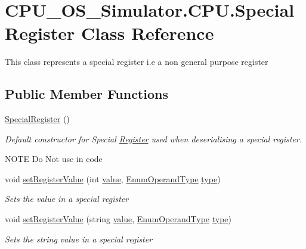 \hypertarget{class_c_p_u___o_s___simulator_1_1_c_p_u_1_1_special_register}{}\section{C\+P\+U\+\_\+\+O\+S\+\_\+\+Simulator.\+C\+P\+U.\+Special\+Register Class Reference}
\label{class_c_p_u___o_s___simulator_1_1_c_p_u_1_1_special_register}


This class represents a special register i.\+e a non general purpose register  


\subsection*{Public Member Functions}
\begin{DoxyCompactItemize}
\item 
\hyperlink{class_c_p_u___o_s___simulator_1_1_c_p_u_1_1_special_register_a697f3e6f938ad7ab0ceee0555fe2c312}{Special\+Register} ()
\begin{DoxyCompactList}\small\item\em Default constructor for Special \hyperlink{class_c_p_u___o_s___simulator_1_1_c_p_u_1_1_register}{Register} used when deserialising a special register. 

N\+O\+T\+E Do Not use in code \end{DoxyCompactList}\item 
void \hyperlink{class_c_p_u___o_s___simulator_1_1_c_p_u_1_1_special_register_ab76c9ab94069230fdf14821495ac9e9c}{set\+Register\+Value} (int \hyperlink{class_c_p_u___o_s___simulator_1_1_c_p_u_1_1_special_register_a90d144e675bb3fe7bbc1f75bafdfde36}{value}, \hyperlink{namespace_c_p_u___o_s___simulator_1_1_c_p_u_ad49cfe442b74115a326c03b7ae848f76}{Enum\+Operand\+Type} \hyperlink{class_c_p_u___o_s___simulator_1_1_c_p_u_1_1_special_register_aae2bca6c1354013cca156bd19c30640d}{type})
\begin{DoxyCompactList}\small\item\em Sets the value in a special register \end{DoxyCompactList}\item 
void \hyperlink{class_c_p_u___o_s___simulator_1_1_c_p_u_1_1_special_register_a6c2605883e6349c10e92f5453c2ad9ea}{set\+Register\+Value} (string \hyperlink{class_c_p_u___o_s___simulator_1_1_c_p_u_1_1_special_register_a90d144e675bb3fe7bbc1f75bafdfde36}{value}, \hyperlink{namespace_c_p_u___o_s___simulator_1_1_c_p_u_ad49cfe442b74115a326c03b7ae848f76}{Enum\+Operand\+Type} \hyperlink{class_c_p_u___o_s___simulator_1_1_c_p_u_1_1_special_register_aae2bca6c1354013cca156bd19c30640d}{type})
\begin{DoxyCompactList}\small\item\em Sets the string value in a special register \end{DoxyCompactList}\end{DoxyCompactItemize}
